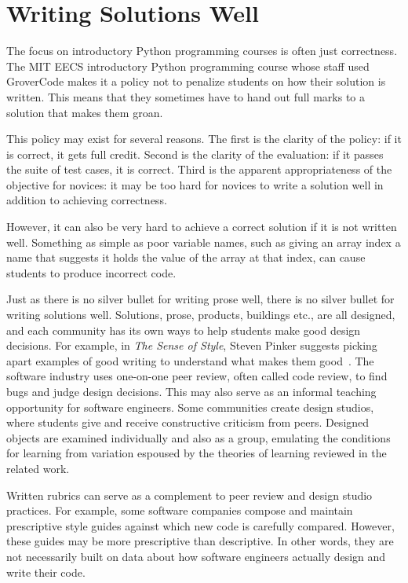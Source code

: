 \section{Writing Solutions Well}

The focus on introductory Python programming courses is often just correctness. The MIT EECS introductory Python programming course whose staff used GroverCode makes it a policy not to penalize students on how their solution is written. This means that they sometimes have to hand out full marks to a solution that makes them groan.

This policy may exist for several reasons. The first is the clarity of the policy: if it is correct, it gets full credit. Second is the clarity of the evaluation: if it passes the suite of test cases, it is correct. Third is the apparent appropriateness of the objective for novices: it may be too hard for novices to write a solution well in addition to achieving correctness. %

However, it can also be very hard to achieve a correct solution if it is not written well. Something as simple as poor variable names, such as giving an array index a name that suggests it holds the value of the array at that index, can cause students to produce incorrect code.

Just as there is no silver bullet for writing prose well, there is no silver bullet for writing solutions well. Solutions, prose, products, buildings etc., are all designed, and each community has its own ways to help students make good design decisions. For example, in {\it The Sense of Style}, Steven Pinker suggests picking apart examples of good writing to understand what makes them good~\cite{pinkersense}. The software industry uses one-on-one peer review, often called code review, to find bugs and judge design decisions. This may also serve as an informal teaching opportunity for software engineers. Some communities create design studios, where students give and receive constructive criticism from peers. Designed objects are examined individually and also as a group, emulating the conditions for learning from variation espoused by the theories of learning reviewed in the related work. 

Written rubrics can serve as a complement to peer review and design studio practices. For example, some software companies compose and maintain prescriptive style guides against which new code is carefully compared. However, these guides may be more prescriptive than descriptive. In other words, they are not necessarily built on data about how software engineers actually design and write their code. %

